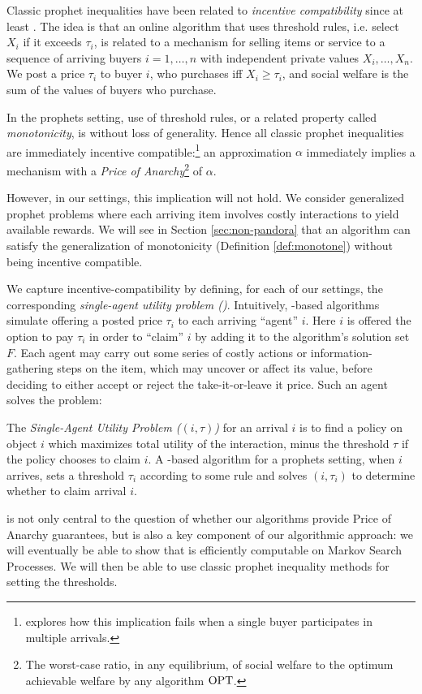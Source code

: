 Classic prophet inequalities have been related to \emph{incentive compatibility} since at least \citet{chawla2010multi}.
The idea is that an online algorithm that uses threshold rules, i.e. select $X_i$ if it exceeds $\tau_i$, is related to a mechanism for selling items or service to a sequence of arriving buyers $i=1,\dots,n$ with independent private values $X_i,\dots,X_n$.
We post a price $\tau_i$ to buyer $i$, who purchases iff $X_i \geq \tau_i$, and social welfare is the sum of the values of buyers who purchase.

In the prophets setting, use of threshold rules, or a related property called \emph{monotonicity}, is without loss of generality.
Hence all classic prophet inequalities are immediately incentive compatible:\footnote{\citet{chawla2024non} explores how this implication fails when a single buyer participates in multiple arrivals.} an approximation $\alpha$ immediately implies a mechanism with a \emph{Price of Anarchy}\footnote{The worst-case ratio, in any equilibrium, of social welfare to the optimum achievable welfare by any algorithm $\mathrm{OPT}$.} of $\alpha$.

However, in our settings, this implication will not hold.
We consider generalized prophet problems where each arriving item involves costly interactions to yield available rewards.
We will see in Section \ref{sec:non-pandora} that an algorithm can satisfy the generalization of monotonicity (Definition \ref{def:monotone}) without being incentive compatible.

We capture incentive-compatibility by defining, for each of our settings, the corresponding \emph{single-agent utility problem (\SAUP{})}.
Intuitively, \SAUP-based algorithms simulate offering a posted price $\tau_i$ to each arriving ``agent'' $i$.
Here $i$ is offered the option to pay $\tau_i$ in order to ``claim'' $i$ by adding it to the algorithm's solution set $F$.
Each agent may carry out some series of costly actions or information-gathering steps on the item, which may uncover or affect its value, before deciding to either accept or reject the take-it-or-leave it price.
Such an agent solves the \SAUP{} problem:

\begin{definition*} 
	The \emph{Single-Agent Utility Problem (\SAUP$(i, \tau)$)} for an arrival $i$ is to find a policy on object $i$ which maximizes total utility of the interaction, minus the threshold $\tau$ if the policy chooses to claim $i$.
	A \SAUP{}-based algorithm for a prophets setting, when $i$ arrives, sets a threshold $\tau_i$ according to some rule and solves \SAUP$(i,\tau_i)$ to determine whether to claim arrival $i$.
\end{definition*}

\SAUP{} is not only central to the question of whether our algorithms provide Price of Anarchy guarantees, but is also a key component of our algorithmic approach: we will eventually be able to show that \SAUP{} is efficiently computable on Markov Search Processes.
We will then be able to use classic prophet inequality methods for setting the thresholds.



